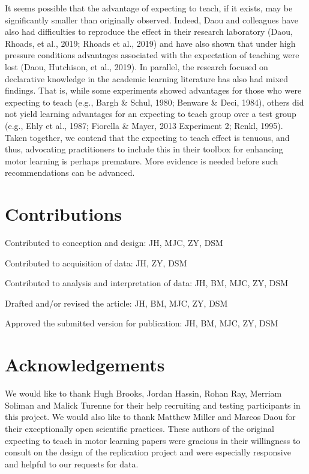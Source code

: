 \documentclass[
  english,
  man,floatsintext]{apa7}
\begin{document}
It seems possible that the advantage of expecting to teach, if it exists, may be significantly smaller than originally observed. Indeed, Daou and colleagues have also had difficulties to reproduce the effect in their research laboratory (Daou, Rhoads, et al., 2019; Rhoads et al., 2019) and have also shown that under high pressure conditions advantages associated with the expectation of teaching were lost (Daou, Hutchison, et al., 2019). In parallel, the research focused on declarative knowledge in the academic learning literature has also had mixed findings. That is, while some experiments showed advantages for those who were expecting to teach (e.g., Bargh \& Schul, 1980; Benware \& Deci, 1984), others did not yield learning advantages for an expecting to teach group over a test group (e.g., Ehly et al., 1987; Fiorella \& Mayer, 2013 Experiment 2; Renkl, 1995). Taken together, we contend that the expecting to teach effect is tenuous, and thus, advocating practitioners to include this in their toolbox for enhancing motor learning is perhaps premature. More evidence is needed before such recommendations can be advanced.

\hypertarget{contributions}{%
\section{Contributions}\label{contributions}}

\noindent Contributed to conception and design: JH, MJC, ZY, DSM

\noindent Contributed to acquisition of data: JH, ZY, DSM

\noindent Contributed to analysis and interpretation of data: JH, BM, MJC, ZY, DSM

\noindent Drafted and/or revised the article: JH, BM, MJC, ZY, DSM

\noindent Approved the submitted version for publication: JH, BM, MJC, ZY, DSM

\hypertarget{acknowledgements}{%
\section{Acknowledgements}\label{acknowledgements}}

We would like to thank Hugh Brooks, Jordan Hassin, Rohan Ray, Merriam Soliman and Malick Turenne for their help recruiting and testing participants in this project. We would also like to thank Matthew Miller and Marcos Daou for their exceptionally open scientific practices. These authors of the original expecting to teach in motor learning papers were gracious in their willingness to consult on the design of the replication project and were especially responsive and helpful to our requests for data.
\end{document}
